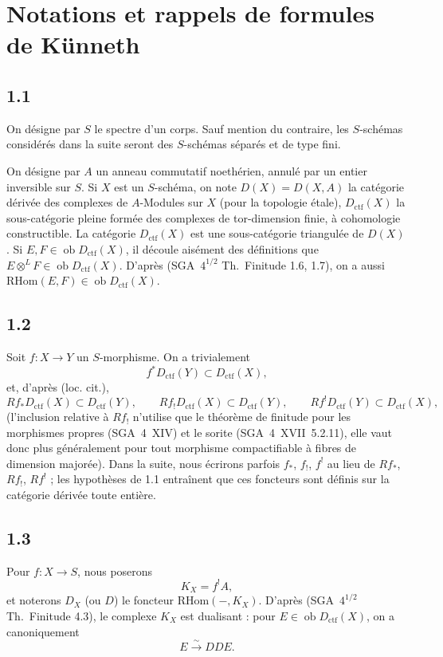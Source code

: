 \documentclass[11pt]{article}
\newcommand{\ob}{\operatorname{ob}}
\providecommand{\RHom}{\mathrm{RHom}}
\providecommand{\ctf}{\mathrm{ctf}}
\providecommand{\RHom}{\mathrm{RHom}}
\providecommand{\ob}{\operatorname{ob}}
\providecommand{\RHom}{\mathrm R\mathcal{H}om}
\begin{document}
\section{Notations et rappels de formules de Künneth}

\subsection*{1.1}
On désigne par $S$ le spectre d'un corps. Sauf mention du contraire, les $S$-schémas considérés dans la suite seront des $S$-schémas séparés et de type fini.

On désigne par $A$ un anneau commutatif noethérien, annulé par un entier inversible sur $S$. Si $X$ est un $S$-schéma, on note $D(X)=D(X,A)$ la catégorie dérivée des complexes de $A$-Modules sur $X$ (pour la topologie étale), $D_{\ctf}(X)$ la sous-catégorie pleine formée des complexes de tor-dimension finie, à cohomologie constructible. La catégorie $D_{\ctf}(X)$ est une sous-catégorie triangulée de $D(X)$. Si $E,F \in \ob D_{\ctf}(X)$, il découle aisément des définitions que $E \otimes^{L} F \in \ob D_{\ctf}(X)$. D'après (SGA~$4^{1/2}$ Th.~Finitude 1.6, 1.7), on a aussi $\RHom(E,F) \in \ob D_{\ctf}(X)$.

\subsection*{1.2}
Soit $f:X\to Y$ un $S$-morphisme. On a trivialement
\[
f^{*}D_{\ctf}(Y) \subset D_{\ctf}(X),
\]
et, d'après (loc. cit.),
\[
Rf_{*}D_{\ctf}(X) \subset D_{\ctf}(Y),\qquad
Rf_{!}D_{\ctf}(X) \subset D_{\ctf}(Y),\qquad
Rf^{!}D_{\ctf}(Y) \subset D_{\ctf}(X),
\]
(l'inclusion relative à $Rf_{!}$ n'utilise que le théorème de finitude pour les morphismes propres (SGA~4~XIV) et le sorite (SGA~4~XVII~5.2.11), elle vaut donc plus généralement pour tout morphisme compactifiable à fibres de dimension majorée). Dans la suite, nous écrirons parfois $f_{*}$, $f_{!}$, $f^{!}$ au lieu de $Rf_{*}$, $Rf_{!}$, $Rf^{!}$ ; les hypothèses de 1.1 entraînent que ces foncteurs sont définis sur la catégorie dérivée toute entière.

\subsection*{1.3}
Pour $f:X\to S$, nous poserons
\[
K_X=f^{!}A,
\]
et noterons $D_X$ (ou $D$) le foncteur $\RHom(-,K_X)$. D'après (SGA~$4^{1/2}$ Th.~Finitude 4.3), le complexe $K_X$ est dualisant : pour $E\in\ob D_{\ctf}(X)$, on a canoniquement
\[
E \xrightarrow{\sim} DDE.
\]
\end{document}

